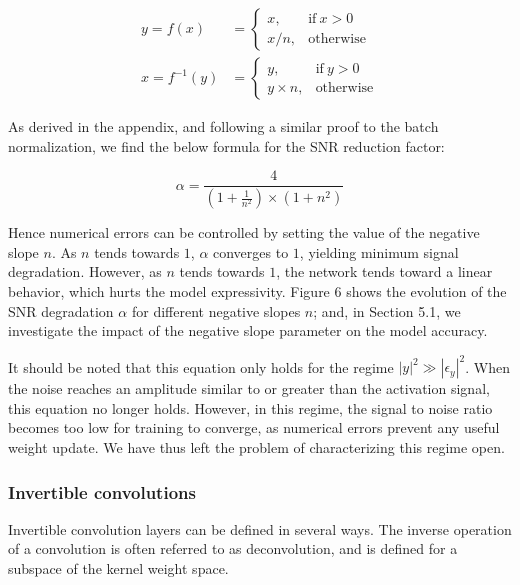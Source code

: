 \documentclass[twocolumn]{bmcart}
\begin{document}
\begin{subequations}
\begin{align}
y = f(x) &=      \begin{cases}
x, & \text{if}\ x>0 \\
x / n, & \text{otherwise}
\end{cases} \\
x = f^{-1}(y) &= \begin{cases}
y, & \text{if}\ y>0 \\
y \times n, & \text{otherwise}
\end{cases}
\end{align}
\end{subequations}

As derived in the appendix, and following a similar proof to the batch normalization,
we find the below formula for the SNR reduction factor:

\begin{equation}
\alpha = \frac{4}{(1+\frac{1}{n^2}) \times (1 + n^2)}
\end{equation}

Hence numerical errors can be controlled by setting the value of the negative slope $n$.
As $n$ tends towards $1$, $\alpha$ converges to $1$, yielding minimum signal degradation.
However, as $n$ tends towards $1$, the network tends toward a linear behavior, which hurts the model expressivity.
Figure 6 shows the evolution of the SNR degradation $\alpha$ for different negative slopes $n$;
and, in Section 5.1, we investigate the impact of the negative slope parameter on the model accuracy.

It should be noted that this equation only holds for the regime $|y|^2 \gg |\epsilon_y|^2$.
When the noise reaches an amplitude similar to or greater than the activation signal, this equation no longer holds.
However, in this regime, the signal to noise ratio becomes too low for training to converge,
as numerical errors prevent any useful weight update.
We have thus left the problem of characterizing this regime open.

\subsubsection{Invertible convolutions}

Invertible convolution layers can be defined in several ways.
The inverse operation of a convolution is often referred to as deconvolution,
and is defined for a subspace of the kernel weight space.
\end{document}
